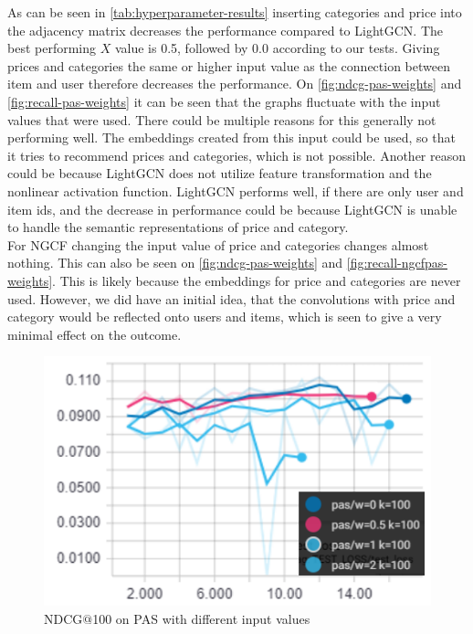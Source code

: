 As can be seen in \autoref{tab:hyperparameter-results} inserting categories and price into the adjacency matrix decreases the performance compared to LightGCN.
The best performing $X$ value is 0.5, followed by 0.0 according to our tests.
Giving prices and categories the same or higher input value as the connection between item and user therefore decreases the performance.
On \autoref{fig:ndcg-pas-weights} and \autoref{fig:recall-pas-weights} it can be seen that the graphs fluctuate with the input values that were used.
There could be multiple reasons for this generally not performing well.
The embeddings created from this input could be used, so that it tries to recommend prices and categories, which is not possible.
Another reason could be because LightGCN does not utilize feature transformation and the nonlinear activation function.
LightGCN performs well, if there are only user and item ids, and the decrease in performance could be because LightGCN is unable to handle the semantic representations of price and category.\\
For NGCF changing the input value of price and categories changes almost nothing.
This can also be seen on \autoref{fig:ndcg-pas-weights} and \autoref{fig:recall-ngcfpas-weights}.
This is likely because the embeddings for price and categories are never used.
However, we did have an initial idea, that the convolutions with price and category would be reflected onto users and items, which is seen to give a very minimal effect on the outcome.


\begin{figure}
    \includegraphics[width=\linewidth]{figures/graphs/ndcg-pas-weights.png}
    \caption{NDCG$@$100 on PAS with different input values}
    \label{fig:ndcg-pas-weights}
\end{figure}

